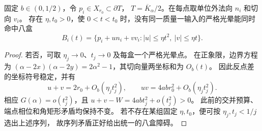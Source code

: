 \begin{lemma}[边界八盒的鲁棒障碍]\label{ic:boxes}
固定 $b\in(0,1/2)$，令 $p_i\in X_{r_0}\subset\partial T$，
$T=\overline K_\alpha/2$。在每点取单位外法向 $n_i$ 和切向 $v_i$。
存在 $\eta,t_0>0$，使 $0<t<t_0$ 时，没有同一质量一输入的严格光晕能同时命中八盒
\[
 B_i(t)=\{p_i+u n_i+v v_i:|u|\le\eta t^2,\ |v|\le\eta t\}.
\]
\end{lemma}
\begin{proof}
若否，可取 $\eta_j\to0$、$t_j\to0$ 及每盒一个严格光晕点。
在正象限，边界方程为
$(\alpha-2x)(\alpha-2y)=2\alpha^2-1$，其切向量两坐标和为 $O_b(t)$。
因此反点差的坐标符号稳定，并有
\[
 u+v=2r_0+O_b(\eta_jt_j^2),\qquad
 uv=4ab r_0^2+O_b(\eta_jt_j^2).
\]
相应 $G(\alpha)=o(t_j^2)$，且 $u+v-W=4ab t_j^2+o(t_j^2)>0$。
此前的交并预算、端点相位和角矩形矛盾均保持不变。
若不存在某组固定 $\eta,t_0$，便可按 $\eta_j,t_j<1/j$ 选出上述序列，
故序列矛盾正好给出统一的八盒障碍。
\end{proof}

